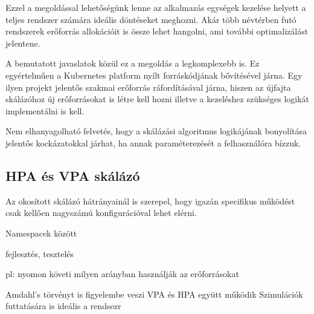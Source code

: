 Ezzel a megoldással lehetőségünk lenne az alkalmazás egységek kezelése helyett a teljes rendszer számára ideális döntéseket meghozni.
Akár több névtérben futó rendszerek erőforrás allokációit is össze lehet hangolni, ami további optimalizálást jelentene.

A bemutatott javaslatok közül ez a megoldás a legkomplexebb is. 
Ez egyértelműen a Kubernetes platform nyílt forráskódjának bővítésével járna.
Egy ilyen projekt jelentős szakmai erőforrás ráfordításával járna, hiszen az újfajta skálázóhoz új erőforrásokat is létre kell hozni illetve a kezeléshez szükséges logikát implementálni is kell.

Nem elhanyagolható felvetés, hogy a skálázási algoritmus logikájának bonyolítása jelentős kockázatokkal járhat, ha annak paraméterezését a felhasználóra bízzuk.

\subsection{HPA és VPA skálázó}
Az okosított skálázó hátrányainál is szerepel, hogy igazán specifikus működést csak kellően nagyszámú konfigurációval lehet elérni.

Namespacek között

fejlesztés, tesztelés

pl: nyomon követi milyen arányban használják az erőforrásokat

Amdahl's törvényt is figyelembe  veszi
VPA és HPA együtt működik
Szimulációk futtatására is ideális a rendsezr